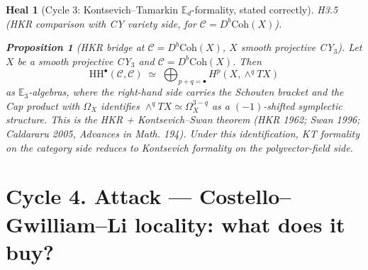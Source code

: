 \documentclass[11pt]{article}
\newtheorem{proposition}[theorem]{Proposition}
\newtheorem*{heal}{Heal}
\theoremstyle{definition}
\providecommand{\HH}{\mathrm{HH}}
\providecommand{\cC}{\mathcal{C}}
\providecommand{\Coh}{\mathrm{Coh}}
\begin{document}
\begin{heal}[Cycle 3: Kontsevich--Tamarkin $\mathbb{E}_d$-formality, stated correctly]
\emph{H3.5 (HKR comparison with CY variety side, for $\cC = D^b\Coh(X)$).}

\begin{proposition}[HKR bridge at $\cC = D^b\Coh(X)$, $X$ smooth
projective CY$_3$]
\label{prop:hkr-bridge}
Let $X$ be a smooth projective CY$_3$ and $\cC = D^b\Coh(X)$. Then
\[
  \HH^\bullet(\cC,\cC) \;\simeq\; \bigoplus_{p+q = \bullet} H^p(X, \wedge^q TX)
\]
as $\mathbb{E}_3$-algebras, where the right-hand side carries the
Schouten bracket and the Cap product with $\Omega_X$ identifies
$\wedge^q TX \simeq \Omega_X^{3-q}$ as a $(-1)$-shifted symplectic
structure. This is the HKR + Kontsevich--Swan theorem (HKR 1962;
Swan 1996; Caldararu 2005, \emph{Advances in Math.} 194). Under this
identification, KT formality on the category side reduces to
Kontsevich formality on the polyvector-field side.
\end{proposition}
\end{heal}

\section*{Cycle 4. Attack --- Costello--Gwilliam--Li locality: what does it buy?}
\end{document}
